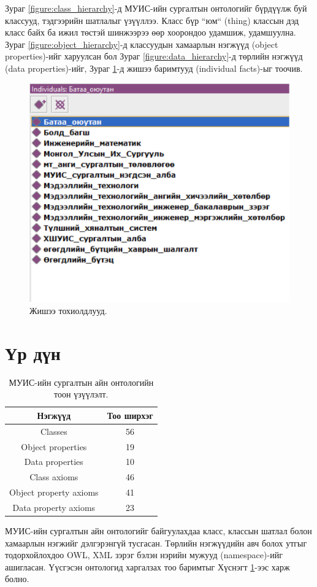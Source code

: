 \documentclass[conference, a4paper, mongolian]{myIEEEtran}
\begin{document}
Зураг \ref{figure:class_hierarchy}-д МУИС-ийн сургалтын онтологийг бүрдүүлж буй классууд, тэдгээрийн шатлалыг үзүүллээ. Класс бүр ``юм`` (thing) классын дэд класс байх ба ижил төстэй шинжээрээ өөр хоорондоо удамшиж, удамшуулна. Зураг \ref{figure:object_hierarchy}-д классуудын хамаарлын нэгжүүд (object properties)-ийг харуулсан бол Зураг \ref{figure:data_hierarchy}-д төрлийн нэгжүүд (data properties)-ийг, Зураг \ref{figure:individuals}-д жишээ баримтууд (individual facts)-ыг тоочив.
%
\begin{figure}[t]
	\centering		
	\includegraphics[width=0.8\linewidth]{figures/individuals}
	\caption{Жишээ тохиолдлууд.}
	\label{figure:individuals}
\end{figure}
%
\section{Үр дүн}
%
\begin{table}[b]
	\renewcommand{\arraystretch}{1.2}
	\centering
	\caption{МУИС-ийн сургалтын айн онтологийн тоон үзүүлэлт.}
	\label{table:1}
	\begin{tabular}{|c||c|}
		\hline
		\textbf{Нэгжүүд}       & \textbf{Тоо ширхэг} \\ \hline \hline
		Classes                & 56  \\ \hline
		Object properties      & 19  \\ \hline
		Data properties        & 10   \\ \hline
		Class axioms           & 46  \\ \hline
		Object property axioms & 41  \\ \hline
		Data property axioms   & 23  \\ \hline
	\end{tabular}
\end{table}
%
МУИС-ийн сургалтын айн онтологийг байгуулахдаа класс, классын шатлал болон хамаарлын нэгжийг дэлгэрэнгүй тусгасан. Төрлийн нэгжүүдийн авч болох утгыг тодорхойлохдоо OWL, XML зэрэг бэлэн нэрийн мужууд (namespace)-ийг ашигласан. Үүсгэсэн онтологид харгалзах тоо баримтыг Хүснэгт \ref{table:1}-ээс харж болно.
\end{document}
